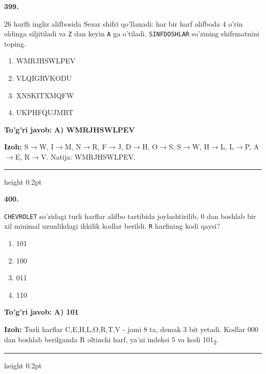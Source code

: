 \documentclass[10pt,a4paper,oneside]{article}
\begin{document}
\noindent\textbf{\color{ink}399.}
\par
26 harfli ingliz alifbosida Sezar shifri qo'llanadi: har bir harf alifboda 4 o'rin oldinga siljitiladi va \texttt{Z} dan keyin \texttt{A} ga o'tiladi. \texttt{SINFDOSHLAR} so'zining shifrmatnini toping.
\begin{enumerate}[label=\Alph*),leftmargin=9mm]
\item WMRJHSWLPEV
\item VLQIGRVKODU
\item XNSKITXMQFW
\item UKPHFQUJMBT
\end{enumerate}
\begin{tcolorbox}[enhanced,breakable,colback=teal!4,colframe=teal!50!black,boxrule=0.5pt,arc=1.1mm,left=3mm,right=3mm,top=1.7mm,bottom=1.7mm,before skip=2mm,after skip=2mm]
\textbf{\color{teal}To'g'ri javob:} \textbf{A) WMRJHSWLPEV}
\par\smallskip
\textbf{Izoh:} S\ensuremath{\to}W, I\ensuremath{\to}M, N\ensuremath{\to}R, F\ensuremath{\to}J, D\ensuremath{\to}H, O\ensuremath{\to}S, S\ensuremath{\to}W, H\ensuremath{\to}L, L\ensuremath{\to}P, A\ensuremath{\to}E, R\ensuremath{\to}V. Natija: WMRJHSWLPEV.
\end{tcolorbox}
\vspace{2mm}\hrule height 0.2pt \vspace{3mm}

\noindent\textbf{\color{ink}400.}
\par
\texttt{CHEVROLET} so'zidagi turli harflar alifbo tartibida joylashtirilib, 0 dan boshlab bir xil minimal uzunlikdagi ikkilik kodlar berildi. \texttt{R} harfining kodi qaysi?
\begin{enumerate}[label=\Alph*),leftmargin=9mm]
\item 101
\item 100
\item 011
\item 110
\end{enumerate}
\begin{tcolorbox}[enhanced,breakable,colback=teal!4,colframe=teal!50!black,boxrule=0.5pt,arc=1.1mm,left=3mm,right=3mm,top=1.7mm,bottom=1.7mm,before skip=2mm,after skip=2mm]
\textbf{\color{teal}To'g'ri javob:} \textbf{A) 101}
\par\smallskip
\textbf{Izoh:} Turli harflar C,E,H,L,O,R,T,V - jami 8 ta, demak 3 bit yetadi. Kodlar 000 dan boshlab berilganda R oltinchi harf, ya'ni indeksi 5 va kodi 101\textsubscript{2}.
\end{tcolorbox}
\vspace{2mm}\hrule height 0.2pt \vspace{3mm}
\end{document}
